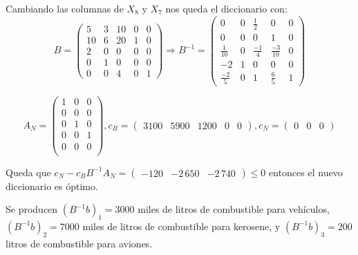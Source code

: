 \documentclass[10pt,a4paper]{article}
\begin{document}
Cambiando las columnas de $X_8$ y $X_7$ nos queda el diccionario con:
\[B = \begin{pmatrix}
	5  & 3 & 10 & 0 & 0 \\
	10 & 6 & 20 & 1 & 0 \\
	2  & 0 & 0  & 0 & 0 \\
	0  & 1 & 0  & 0 & 0 \\
	0  & 0 & 4  & 0 & 1
\end{pmatrix} \Rightarrow B^{-1} = \begin{pmatrix}
	0 & 0 & \frac{1}{2} & 0 & 0 \\
	0 & 0 & 0 & 1 & 0 \\
	\frac{1}{10} & 0 & \frac{-1}{4} & \frac{-3}{10} & 0 \\
	-2 & 1 & 0 & 0 & 0 \\
	\frac{-2}{5} & 0 & 1 & \frac{6}{5} & 1
\end{pmatrix}\]

\[
	A_N = \begin{pmatrix}
		1 & 0 & 0 \\
		0 & 0 & 0 \\
		0 & 1 & 0 \\
		0 & 0 & 1 \\
		0 & 0 & 0 \\
	\end{pmatrix},
	c_B = \begin{pmatrix} 3100 & 5900 & 1200 & 0 & 0 \end{pmatrix},
	c_N = \begin{pmatrix} 0 & 0 & 0 \end{pmatrix}
\]

Queda que $c_N - c_B B^{-1} A_N = \begin{pmatrix} -120 & -2\,650 & -2\,740 \end{pmatrix} \leq 0$ entonces el nuevo diccionario es óptimo.

Se producen $(B^{-1}b)_1 = 3000$ miles de litros de combustible para vehículos, $(B^{-1}b)_2 = 7000$ miles de litros de combustible para kerosene, y $(B^{-1}b)_3 = 200$ litros de combustible para aviones.

\section{} %
\section{} %
\section{} %
\end{document}
